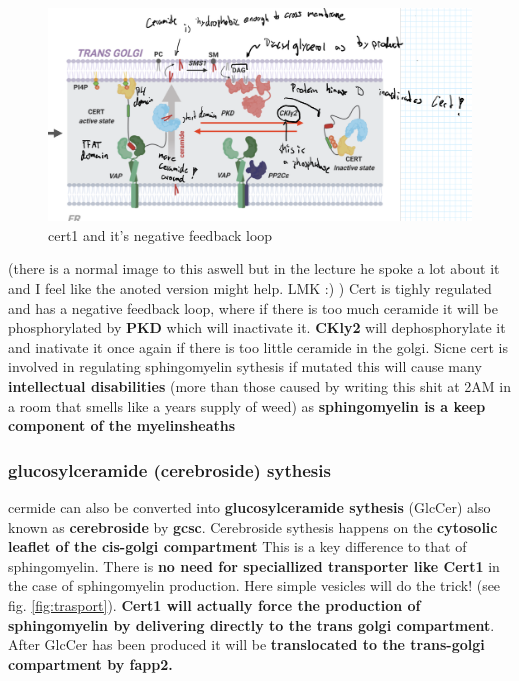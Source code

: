 \documentclass[../main.tex]{subfiles}
\begin{document}
\begin{figure}[H]
    \centering
    \includegraphics[width=\linewidth]{cert1_2_annotated.png}
    \caption{cert1 and it's negative feedback loop}
    \label{fig:enter-label}
\end{figure}
(there is a normal image to this aswell but in the lecture he spoke a lot about it and I feel like the anoted version might help. LMK :) )
Cert is tighly regulated and has a negative feedback loop, where if there is too much ceramide it will be phosphorylated by \textbf{PKD} which will inactivate it. \textbf{CKly2} will dephosphorylate it and inativate it once again if there is too little ceramide in the golgi. Sicne cert is involved in regulating sphingomyelin sythesis if mutated this will cause many \textbf{intellectual disabilities} (more than those caused by writing this shit at 2AM in a room that smells like a years supply of weed) as \textbf{sphingomyelin is a keep component of the myelinsheaths}

\subsubsection{glucosylceramide (cerebroside) sythesis}

cermide can also be converted into \textbf{glucosylceramide sythesis }(GlcCer) also known as \textbf{\gls{cerebroside}} by \textbf{\gls{gcsc}}. Cerebroside sythesis happens on the\textbf{ cytosolic leaflet of the cis-golgi compartment} This is a key difference to that of sphingomyelin. There is \textbf{no need for speciallized transporter like Cert1} in the case of sphingomyelin production. Here simple vesicles will do the trick! (see fig. \ref{fig:trasport}). \textbf{Cert1 will actually force the production of sphingomyelin by delivering directly to the trans golgi compartment}. After GlcCer has been produced it will be \textbf{translocated to the trans-golgi compartment by \gls{fapp2}.}
\end{document}

